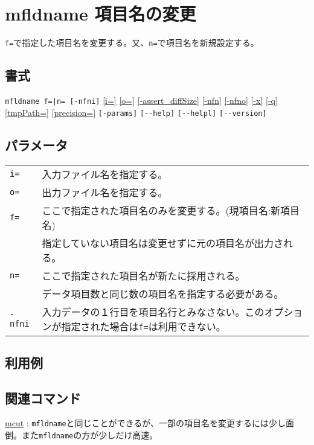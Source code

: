 
%

\section{mfldname 項目名の変更\label{sect:mfldname}}
\verb|f=|で指定した項目名を変更する。又、\verb|n=|で項目名を新規設定する。

\subsection*{書式}
\verb/mfldname f=|n= [-nfni]/
\hyperref[sect:option_i]{[i=]}
\hyperref[sect:option_o]{[o=]}
\hyperref[sect:option_assert_diffSize]{[-assert\_diffSize]}
\hyperref[sect:option_nfn]{[-nfn]}
\hyperref[sect:option_nfno]{[-nfno]}
\hyperref[sect:option_x]{[-x]}
\hyperref[sect:option_q]{[-q]}
\hyperref[sect:option_option_tmppath]{[tmpPath=]}
\hyperref[sect:option_precision]{[precision=]}
\verb|[-params]|
\verb|[--help]|
\verb|[--helpl]|
\verb|[--version]|\\

\subsection*{パラメータ}
\begin{table}[htbp]
{\small
\begin{tabular}{ll}
\verb|i=|    & 入力ファイル名を指定する。\\
\verb|o=|    & 出力ファイル名を指定する。\\
\verb|f=|    & ここで指定された項目名のみを変更する。(現項目名:新項目名)\\
             & 指定していない項目名は変更せずに元の項目名が出力される。\\
\verb|n=|    & ここで指定された項目名が新たに採用される。\\
             & データ項目数と同じ数の項目名を指定する必要がある。\\
\verb|-nfni| & 入力データの１行目を項目名行とみなさない。このオプションが指定された場合は\verb|f=|は利用できない。\\
\end{tabular} 
}
\end{table} 

\subsection*{利用例}

\subsection*{関連コマンド}
\hyperref[sect:mcut]{mcut} : \verb|mfldname|と同じことができるが、一部の項目名を変更するには少し面倒。また\verb|mfldname|の方が少しだけ高速。

%
